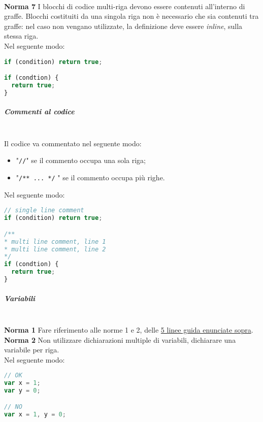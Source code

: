 \-\\
\textbf{Norma 7}
I blocchi di codice multi-riga devono essere contenuti all'interno di graffe. Blocchi costituiti da una singola riga non è necessario che sia contenuti tra graffe: nel caso non vengano utilizzate, la definizione deve essere \textit{inline}, sulla stessa riga.\\
Nel seguente modo:
\begin{lstlisting}[language=JavaScript]
if (condition) return true;

if (condtion) {
  return true;
}
\end{lstlisting}

\subparagraph{Commenti al codice}\-\\
Il codice va commentato nel seguente modo:
\begin{itemize}
	\item "\texttt{//}" se il commento occupa una sola riga;
	\item "\texttt{/** ... */} " se il commento occupa più righe.
\end{itemize}
Nel seguente modo:
\begin{lstlisting}[language=JavaScript]
// single line comment
if (condition) return true;

/**
* multi line comment, line 1
* multi line comment, line 2
*/
if (condtion) {
  return true;
}
\end{lstlisting}

\subparagraph{Variabili}\-\\
\textbf{Norma 1}
Fare riferimento alle norme 1 e 2, delle \underline{5 linee guida enunciate sopra}.\\

\textbf{Norma 2}
Non utilizzare dichiarazioni multiple di variabili, dichiarare una variabile per riga.\\
Nel seguente modo:
\begin{lstlisting}[language=JavaScript]
// OK
var x = 1;
var y = 0;

// NO
var x = 1, y = 0;
\end{lstlisting}

